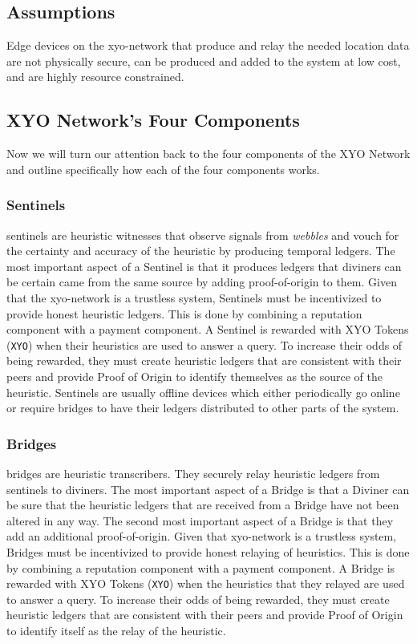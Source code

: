 \documentclass{article}
\begin{document}
\subsection {Assumptions}
Edge devices on the \Gls{xyo-network} that produce and relay the needed location data are not physically secure, can be produced and added to the system at low cost, and are highly resource constrained.

\subsection {XYO Network's Four Components}

Now we will turn our attention back to the four components of the XYO Network and outline specifically how each of the four components works.

\subsubsection {Sentinels}
\Glspl{sentinel} are \gls{heuristic} witnesses that observe signals from \textit{webbles} and vouch for the \gls{certainty} and \gls{accuracy} of the heuristic by producing temporal ledgers. The most important aspect of a Sentinel is that it produces ledgers that \Glspl{diviner} can be certain came from the same source by adding \Gls{proof-of-origin} to them. Given that the \Gls{xyo-network} is a trustless system, Sentinels must be incentivized to provide honest heuristic ledgers. This is done by combining a reputation component with a payment component. A Sentinel is rewarded with XYO Tokens (\texttt{XYO}) when their heuristics are used to answer a query. To increase their odds of being rewarded, they must create heuristic ledgers that are consistent with their peers and provide Proof of Origin to identify themselves as the source of the heuristic. Sentinels are usually offline devices which either periodically go online or require \Glspl{bridge} to have their ledgers distributed to other parts of the system.

\subsubsection {Bridges}
\Glspl{bridge} are \gls{heuristic} transcribers. They securely relay heuristic ledgers from \Glspl{sentinel} to \Glspl{diviner}. The most important aspect of a Bridge is that a Diviner can be sure that the heuristic ledgers that are received from a Bridge have not been altered in any way. The second most important aspect of a Bridge is that they add an additional \Gls{proof-of-origin}. Given that \Gls{xyo-network} is a trustless system, Bridges must be incentivized to provide honest relaying of heuristics. This is done by combining a reputation component with a payment component. A Bridge is rewarded with XYO Tokens (\texttt{XYO}) when the heuristics that they relayed are used to answer a query. To increase their odds of being rewarded, they must create heuristic ledgers that are consistent with their peers and provide Proof of Origin to identify itself as the relay of the heuristic.
\end{document}

